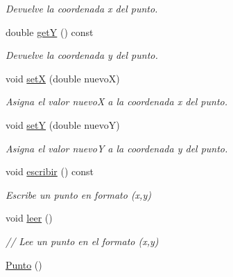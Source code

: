 \begin{DoxyCompactItemize}
\begin{DoxyCompactList}\small\item\em Devuelve la coordenada x del punto. \end{DoxyCompactList}\item 
double \hyperlink{classPunto_a214978b8bbae48ca5927f2e56fb3bd22}{getY} () const \hypertarget{classPunto_a214978b8bbae48ca5927f2e56fb3bd22}{}\label{classPunto_a214978b8bbae48ca5927f2e56fb3bd22}

\begin{DoxyCompactList}\small\item\em Devuelve la coordenada y del punto. \end{DoxyCompactList}\item 
void \hyperlink{classPunto_a51ae6616f828bb2b4111bc8ace49dbca}{setX} (double nuevoX)\hypertarget{classPunto_a51ae6616f828bb2b4111bc8ace49dbca}{}\label{classPunto_a51ae6616f828bb2b4111bc8ace49dbca}

\begin{DoxyCompactList}\small\item\em Asigna el valor nuevoX a la coordenada x del punto. \end{DoxyCompactList}\item 
void \hyperlink{classPunto_a6a0f8adb5946f31a7867a06f54d97462}{setY} (double nuevoY)\hypertarget{classPunto_a6a0f8adb5946f31a7867a06f54d97462}{}\label{classPunto_a6a0f8adb5946f31a7867a06f54d97462}

\begin{DoxyCompactList}\small\item\em Asigna el valor nuevoY a la coordenada y del punto. \end{DoxyCompactList}\item 
void \hyperlink{classPunto_afc543b48134f632fa354d8b027954e80}{escribir} () const \hypertarget{classPunto_afc543b48134f632fa354d8b027954e80}{}\label{classPunto_afc543b48134f632fa354d8b027954e80}

\begin{DoxyCompactList}\small\item\em Escribe un punto en formato (x,y) \end{DoxyCompactList}\item 
void \hyperlink{classPunto_a84cc9b0ee2e5b00842e7bff819b80459}{leer} ()\hypertarget{classPunto_a84cc9b0ee2e5b00842e7bff819b80459}{}\label{classPunto_a84cc9b0ee2e5b00842e7bff819b80459}

\begin{DoxyCompactList}\small\item\em // Lee un punto en el formato (x,y) \end{DoxyCompactList}\item 
\hyperlink{classPunto_a4b8b70b933ff13493ee5ddb3c8532c10}{Punto} ()\hypertarget{classPunto_a4b8b70b933ff13493ee5ddb3c8532c10}{}\label{classPunto_a4b8b70b933ff13493ee5ddb3c8532c10}


\end{DoxyCompactItemize}

